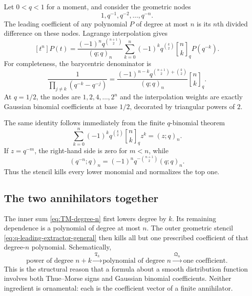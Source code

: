 \documentclass[11pt,oneside]{article}
\theoremstyle{definition}
\theoremstyle{remark}
\newcommand{\poch}[3]{\left(#1;#2\right)_{#3}}
\newcommand{\qbinom}[3]{\genfrac{[}{]}{0pt}{}{#1}{#2}_{#3}}
\newcommand{\Toperator}{\mathfrak T}
\newcommand{\Qoperator}{\mathfrak Q}
\newcommand{\coeff}[2]{\left[#1^{#2}\right]}
\begin{document}
Let $0<q<1$ for a moment, and consider the geometric nodes
\[
  1,q^{-1},q^{-2},\ldots,q^{-n}.
\]
The leading coefficient of any polynomial $P$ of degree at most $n$ is its
$n$th divided difference on these nodes.  Lagrange interpolation gives
\begin{equation}\label{eq:q-leading-extractor-general}
 \coeff{t}{n}P(t)
 =\frac{(-1)^nq^{\binom{n+1}{2}}}{\poch{q}{q}{n}}
  \sum_{k=0}^{n}
  (-1)^kq^{\binom k2}\qbinom{n}{k}{q}P(q^{-k}).
\end{equation}
For completeness, the barycentric denominator is
\begin{equation}\label{eq:barycentric-denominator}
 \frac1{\displaystyle\prod_{j\ne k}(q^{-k}-q^{-j})}
 =\frac{(-1)^{n-k}q^{\binom{n+1}{2}+\binom k2}}
 {\poch{q}{q}{n}}\qbinom{n}{k}{q}.
\end{equation}
At $q=1/2$, the nodes are $1,2,4,\ldots,2^n$ and the interpolation weights are
exactly Gaussian binomial coefficients at base $1/2$, decorated by triangular
powers of $2$.

The same identity follows immediately from the finite $q$-binomial theorem
\begin{equation}\label{eq:finite-q-binomial}
 \sum_{k=0}^{n}(-1)^kq^{\binom k2}\qbinom{n}{k}{q}z^k
 =\poch{z}{q}{n}.
\end{equation}
If $z=q^{-m}$, the right-hand side is zero for $m<n$, while
\begin{equation}\label{eq:q-survivor}
  \poch{q^{-n}}{q}{n}
  =(-1)^nq^{-\binom{n+1}{2}}\poch{q}{q}{n}.
\end{equation}
Thus the stencil kills every lower monomial and normalizes the top one.

\subsection{The two annihilators together}

The inner sum \eqref{eq:TM-degree-n} first lowers degree by $k$.  Its remaining
dependence is a polynomial of degree at most $n$.  The outer geometric stencil
\eqref{eq:q-leading-extractor-general} then kills all but one prescribed
coefficient of that degree-$n$ polynomial.  Schematically,
\[
 \boxed{
 \text{power of degree }n+k
 \xrightarrow{\ \Toperator_k\ }
 \text{polynomial of degree }n
 \xrightarrow{\ \Qoperator_n\ }
 \text{one coefficient}.}
\]
This is the structural reason that a formula about a smooth distribution
function involves both Thue--Morse signs and Gaussian binomial coefficients.
Neither ingredient is ornamental: each is the coefficient vector of a finite
annihilator.
\end{document}
